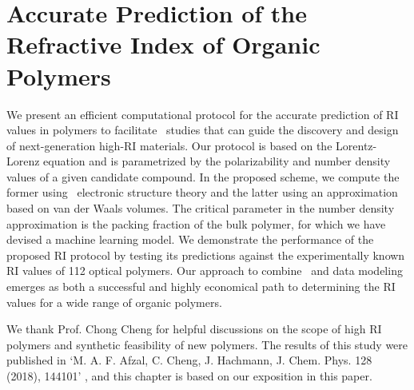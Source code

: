 \chapter{Accurate Prediction of the Refractive Index of Organic Polymers}

We present an efficient computational protocol for the accurate prediction of RI values in polymers to facilitate \insilico\ studies that can guide the discovery and design of next-generation high-RI materials. Our protocol is based on the Lorentz-Lorenz equation and is parametrized by the polarizability and number density values of a given candidate compound. In the proposed scheme, we compute the former using \firstprinciples\  electronic structure theory and the latter using an approximation based on van der Waals volumes. The critical parameter in the number density approximation is the packing fraction of the bulk polymer, for which we have devised a machine learning model. We demonstrate the performance of the proposed RI protocol by testing its predictions against the experimentally known RI values of 112 optical polymers. Our approach to combine \firstprinciples\  and data modeling emerges as both a successful and highly economical path to determining the RI values for a wide range of organic polymers.

We thank Prof. Chong Cheng for helpful discussions on the scope of high RI polymers and synthetic feasibility of new polymers. The results of this study were published in ‘M. A. F. Afzal, C. Cheng, J. Hachmann, J. Chem. Phys. 128 (2018), 144101’ \cite{Afzal2018a}, and this chapter is based on our exposition in this paper. 

